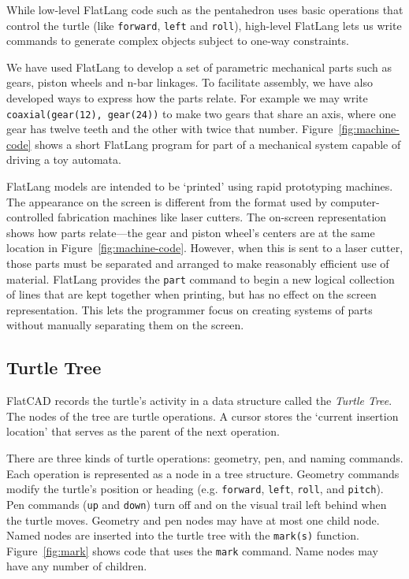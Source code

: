 \documentclass[times, 10pt,twocolumn]{article}
\begin{document}
While low-level \nohyphens{FlatLang} code such as the pentahedron uses
basic operations that control the turtle (like \textnhtt{forward},
\textnhtt{left} and \textnhtt{roll}), high-level \nohyphens{FlatLang}
lets us write commands to generate complex objects subject to one-way
constraints.

We have used \nohyphens{FlatLang} to develop a set of parametric
mechanical parts such as gears, piston wheels and n-bar linkages. To
facilitate assembly, we have also developed ways to express how the
parts relate. For example we may write
\textnhtt{coaxial(gear(12),~gear(24))} to make two gears that share an
axis, where one gear has twelve teeth and the other with twice that
number. Figure~\ref{fig:machine-code} shows a short
\nohyphens{FlatLang} program for part of a mechanical system capable
of driving a toy automata.

\nohyphens{FlatLang} models are intended to be `printed' using rapid
prototyping machines. The appearance on the screen is different from
the format used by computer-controlled fabrication machines like laser
cutters. The on-screen representation shows how parts relate---the
gear and piston wheel's centers are at the same location in
Figure~\ref{fig:machine-code}. However, when this is sent to a laser
cutter, those parts must be separated and arranged to make reasonably
efficient use of material. \nohyphens{FlatLang} provides the
\textnhtt{part} command to begin a new logical collection of lines
that are kept together when printing, but has no effect on the screen
representation. This lets the programmer focus on creating systems of
parts without manually separating them on the screen.

\subsection{Turtle Tree}

\nohyphens{FlatCAD} records the turtle's activity in a data structure
called the \textit{Turtle Tree}. The nodes of the tree are turtle
operations. A cursor stores the `current insertion location' that
serves as the parent of the next operation.

There are three kinds of turtle operations: geometry, pen, and naming
commands. Each operation is represented as a node in a tree
structure. Geometry commands modify the turtle's position or heading
(e.g. \textnhtt{forward}, \textnhtt{left}, \textnhtt{roll}, and
\textnhtt{pitch}). Pen commands (\textnhtt{up} and \textnhtt{down})
turn off and on the visual trail left behind when the turtle
moves. Geometry and pen nodes may have at most one child node. Named
nodes are inserted into the turtle tree with the \textnhtt{mark(s)}
function. Figure~\ref{fig:mark} shows code that uses the
\textnhtt{mark} command. Name nodes may have any number of children.
\end{document}
